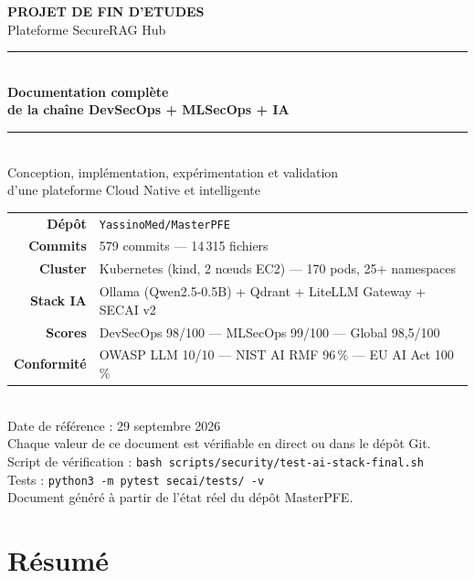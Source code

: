\documentclass[12pt,a4paper,openany]{report}
\begin{document}
\begin{titlepage}
\centering
\vspace*{1cm}
{\Large \textbf{PROJET DE FIN D'ETUDES}}\\[0.3cm]
{\large Plateforme SecureRAG Hub}\\[1.2cm]
\rule{\textwidth}{1.5pt}\\[0.5cm]
{\Huge \textbf{Documentation complète}}\\[0.3cm]
{\Huge \textbf{de la chaîne DevSecOps + MLSecOps + IA}}\\[0.5cm]
\rule{\textwidth}{1.5pt}\\[0.8cm]
{\large Conception, implémentation, expérimentation et validation}\\
{\large d'une plateforme Cloud Native et intelligente}\\[1.0cm]
\begin{tabular}{rl}
\textbf{Dépôt} & \texttt{YassinoMed/MasterPFE} \\
\textbf{Commits} & 579 commits — 14\,315 fichiers \\
\textbf{Cluster} & Kubernetes (kind, 2 n\oe uds EC2) — 170 pods, 25+ namespaces \\
\textbf{Stack IA} & Ollama (Qwen2.5-0.5B) + Qdrant + LiteLLM Gateway + SECAI v2 \\
\textbf{Scores} & DevSecOps 98/100 — MLSecOps 99/100 — Global 98,5/100 \\
\textbf{Conformité} & OWASP LLM 10/10 — NIST AI RMF 96\,\% — EU AI Act 100\,\% \\
\end{tabular}\\[1.2cm]
{\large Date de référence : 29 septembre 2026}\\[0.3cm]
{\small Chaque valeur de ce document est vérifiable en direct ou dans le dépôt Git.}\\
{\small Script de vérification : \texttt{bash scripts/security/test-ai-stack-final.sh}}\\
{\small Tests : \texttt{python3 -m pytest secai/tests/ -v}}\\[1.0cm]
\vfill
{\small Document généré à partir de l'état réel du dépôt MasterPFE.}\\
\end{titlepage}

\section*{Résumé}
\end{document}
